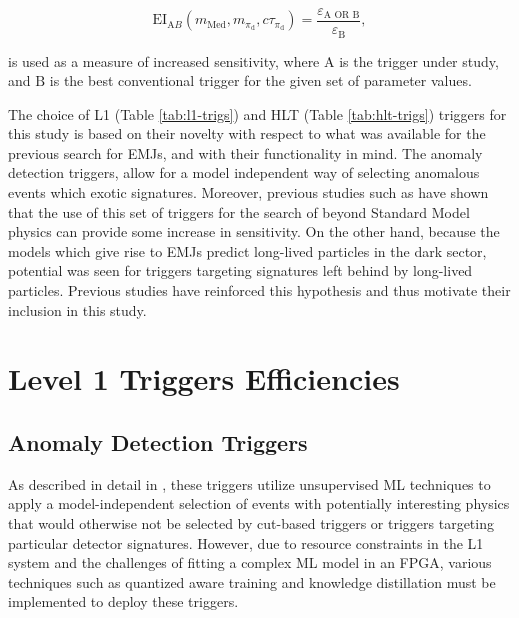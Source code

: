 \begin{equation}
    \text{EI}_{\text{A}B} (m_{\text{Med}}, m_{\pi_{\text{d}}},c\tau_{\pi_{\text{d}}}) = \frac{\varepsilon_{\text{A OR B}}}{\varepsilon_{\text{B}}},
\end{equation}

\noindent is used as a measure of increased sensitivity, where $\text{A}$ is the trigger under study, and $\text{B}$ is the best conventional trigger for the given set of parameter values.

The choice of L1 (Table \ref{tab:l1-trigs}) and HLT (Table \ref{tab:hlt-trigs}) triggers for this study is based on their novelty with respect to what was available for the previous search for EMJs, and with their functionality in mind. The anomaly detection triggers, allow for a model independent way of selecting anomalous events which exotic signatures. Moreover, previous studies such as \cite{} have shown that the use of this set of triggers for the search of beyond Standard Model physics can provide some increase in sensitivity. On the other hand, because the models which give rise to EMJs predict long-lived particles in the dark sector, potential was seen for triggers targeting signatures left behind by long-lived particles. Previous studies have reinforced this hypothesis \cite{} and thus motivate their inclusion in this study.

\section{Level 1 Triggers Efficiencies}



\subsection{Anomaly Detection Triggers}

As described in detail in \cite{}, these triggers utilize unsupervised ML techniques to apply a model-independent selection of events with potentially interesting physics that would otherwise not be selected by cut-based triggers or triggers targeting particular detector signatures. However, due to resource constraints in the L1 system and the challenges of fitting a complex ML model in an FPGA, various techniques such as quantized aware training and knowledge distillation must be implemented to deploy these triggers.

